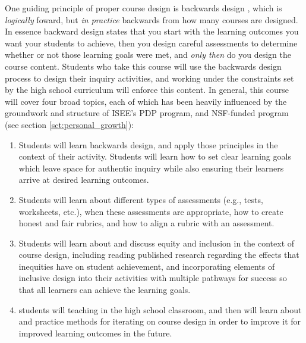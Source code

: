 \documentclass[aasms,11pt]{article}
\begin{document}
One guiding principle of proper course design is backwards design \citep{wiggins&mctighe1998}, which is \emph{logically} foward, but \emph{in practice} backwards from how many courses are designed.
In essence backward design states that you start with the learning outcomes you want your students to achieve, then you design careful assessments to determine whether or not those learning goals were met, and \emph{only then} do you design the course content.
Students who take this course will use the backwards design process to design their inquiry activities, and working under the constraints set by the high school curriculum will enforce this content.
In general, this course will cover four broad topics, each of which has been heavily influenced by the groundwork and structure of ISEE's PDP program, and NSF-funded program (see section \ref{sct:personal_growth}):
\begin{enumerate}
\vspace{-9pt}
\item Students will learn backwards design, and apply those principles in the context of their activity.
Students will learn how to set clear learning goals which leave space for authentic inquiry while also ensuring their learners arrive at desired learning outcomes.
\vspace{-9pt}
\item Students will learn about different types of assessments (e.g., tests, worksheets, etc.), when these assessments are appropriate, how to create honest and fair rubrics, and how to align a rubric with an assessment.
\vspace{-9pt}
\item Students will learn about and discuss equity and inclusion in the context of course design, including reading published research regarding the effects that inequities have on student achievement, and incorporating elements of inclusive design into their activities with multiple pathways for success so that all learners can achieve the learning goals.
\vspace{-9pt}
\item students will teaching in the high school classroom, and then will learn about and practice methods for iterating on course design in order to improve it for improved learning outcomes in the future.
\vspace{-9pt}
\end{enumerate}
\end{document}

